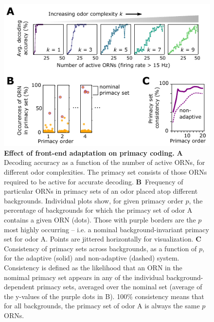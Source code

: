 \documentclass[9pt,lineno]{elife}
\begin{document}
\begin{figure}[tb]
		\includegraphics[width=0.8\linewidth]{figure4}
		\caption{\footnotesize{\textbf{Effect of front-end adaptation on primacy coding.}
				\textbf{A} Decoding accuracy as a function of the number of active ORNs, for different odor complexities. The primacy set consists of those ORNs required to be active for accurate decoding. %
				\textbf{B}~Frequency of particular ORNs in primacy sets of an odor placed atop different backgrounds. Individual plots show, for given primacy order $p$, the percentage of backgrounds for which the primacy set of odor A contains a given ORN (dots). Those with purple borders are the $p$ most highly occurring -- i.e. a nominal background-invariant primacy set for odor A. Points are jittered horizontally for visualization.
				\textbf{C}~{\color{blue} Consistency of primacy sets across backgrounds, as a function of $p$, for the adaptive (solid) and non-adaptive (dashed) system}. Consistency is defined as the likelihood that an ORN in the nomimal primacy set appears in any of the individual background-dependent primacy sets, averaged over the nominal set (average of the y-values of the purple dots in B). 100\% consistency means that for all backgrounds, the primacy set of odor A is always the same $p$ ORNs.
		}}
		\label{fig:primacy_coding}
\end{figure}
\end{document}
